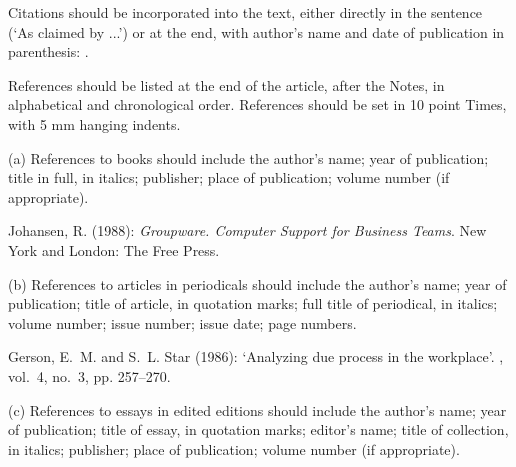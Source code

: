 \documentclass{ecscw2007}
\begin{document}
Citations should be incorporated into the text, either directly in the sentence (`As claimed by \citet{Bowers91}...') or at the end, with author's name and date of publication in parenthesis: \cite{Bowers91}.

References should be listed at the end of the article, after the Notes, in alphabetical and chronological order. References should be set in 10 point Times, with 5 mm hanging indents.

(a) References to books should include the author's name; year of publication; title in full, in italics; publisher; place of publication; volume number (if appropriate).


\begin{list}{}{\settowidth{}%
  \leftmargin{}
  \advance\leftmargin{}}
\small
{}
Johansen, R. (1988): {\em Groupware. Computer Support for Business Teams}.
\newblock New York and London: The Free Press.
\end{list}

(b) References to articles in periodicals should include the author's name; year of publication; title of article, in quotation marks; full title of periodical, in italics; volume number; issue number; issue date; page numbers.


\begin{list}{}{\settowidth{}%
  \leftmargin{}
  \advance\leftmargin{}}
\small
{}
Gerson, E.~M. and S.~L. Star (1986): `Analyzing due process in the workplace'.
, vol.~4, no.~3,
  pp. 257--270.
\end{list}

(c) References to essays in edited editions should include the author's name; year of publication; title of essay, in quotation marks; editor's name; title of collection, in italics; publisher; place of publication; volume number (if appropriate).

\end{document}
